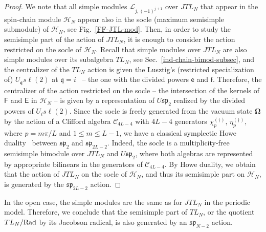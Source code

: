 \documentclass[11pt]{article}
\newcommand{\q}{\mathfrak{q}}
\newcommand{\TL}[1]{TL_{#1}}
\newcommand{\JTL}[1]{JTL_{#1}}
\newcommand{\LQG}{U_{\q} s\ell(2)}
\newcommand{\LQGi}{U_{i} s\ell(2)}
\newcommand{\F}{\mathsf{F}}
\newcommand{\f}{\mathsf{f}}
\newcommand{\E}{\mathsf{E}}
\newcommand{\e}{\mathsf{e}}
\newcommand{\Hilb}{\mathcal{H}}
\newcommand{\vac}{\boldsymbol{\Omega}}
\newcommand{\Clif}[1]{\mathscr{C}_{#1}}
\newcommand{\ssp}{\mathfrak{sp}}
\newcommand{\AIrrTL}[2]{\mathscr{L}_{#1,#2}}
\theoremstyle{definition}
\begin{document}
\begin{proof}
We note that all simple modules $\AIrrTL{j}{(-1)^{j+1}}$ over $\JTL{N}$ that appear in  the spin-chain module $\Hilb_N$ appear also in the socle (maximum semisimple submodule) of $\Hilb_N$, see Fig.~\ref{FF-JTL-mod}. Then, in order to study the semisimple part of the action of $\JTL{N}$, it is enough to consider the action restricted on the socle of $\Hilb_N$. Recall that  simple modules over $\JTL{N}$ are also simple modules over its subalgebra $\TL{N}$, see Sec.~\ref{ind-chain-bimod-subsec}, and the centralizer of the $\TL{N}$ action is given the Lusztig's (restricted specialization of) $\LQG$ at $\q=i$~\cite{M1} -- the one with the divided powers $\e$ and $\f$. Therefore,  the centralizer of the action restricted on the socle  -- the intersection of the kernels of $\F$ and $\E$
in $\Hilb_N$ -- is  given by a representation of $U \ssp_2$ realized by the divided powers of $\LQGi$. Since the socle is freely generated from the vacuum state $\vac$ by the action of a Clifford algebra $\Clif{4L-4}$  with
$4L-4$ generators   $\chi^{(\dagger)}_{p}$, $\eta^{(\dagger)}_p$, where
$p=m\pi/L$ and $1\leq m\leq L-1$, we have a classical symplectic Howe duality~\cite{H3} between $\ssp_{2}$ and $\ssp_{2L-2}$. Indeed, the socle is a multiplicity-free semisimple bimodule over $\JTL{N}$ and $U \ssp_{2}$, where both algebras are represented  by appropriate bilinears in the generators of  $\Clif{4L-4}$. By  Howe duality, we obtain that the action of $\JTL{N}$ on the socle of $\Hilb_N$, and thus its semisimple part on $\Hilb_N$, is generated by the $\ssp_{2L-2}$ action.
\end{proof}

In the open case, the simple modules are the same as for $\JTL{N}$ in the periodic model. Therefore, we conclude that the semisimple part of $\TL{N}$, or the quotient $\TL{N}/\rad$ by its Jacobson radical, is  also generated by an  $\ssp_{N-2}$ action.
\end{document}
